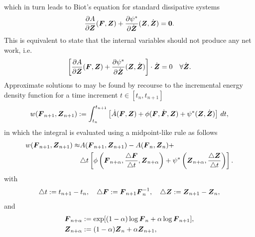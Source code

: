 \documentclass[12pt]{article}
\numberwithin{equation}{section}
\begin{document}
which in turn leads to Biot's equation for standard dissipative systems
\begin{equation} \label{eq:Biots-equation}
  \frac{\partial A}{\partial {\boldsymbol{Z}}} ({\boldsymbol{F}}, {\boldsymbol{Z}})
  +
  \frac{\partial \psi^*}{\partial \dot{{\boldsymbol{Z}}}} ({\boldsymbol{Z}}, \dot{{\boldsymbol{Z}}})
  =
  \mathbf{0}.
\end{equation}
This is equivalent to state that the internal variables should not
produce any net work, i.e.
\begin{equation} \label{eq:internal-no-work}
  \left[
    \frac{\partial A}{\partial {\boldsymbol{Z}}} ({\boldsymbol{F}}, {\boldsymbol{Z}})
    +
    \frac{\partial \psi^*}{\partial \dot{{\boldsymbol{Z}}}} ({\boldsymbol{Z}}, \dot{{\boldsymbol{Z}}})
  \right]
  \cdot
   \dot{{\boldsymbol{Z}}}
  =
  0
  \quad
  \forall \dot{{\boldsymbol{Z}}}.
\end{equation}
Approximate solutions to  may be found by
recourse to the incremental energy density function for a time
increment $t \in [t_n, t_{n+1}]$
\begin{equation} \label{incremental-energy-density}
  w({\boldsymbol{F}}_{n+1}, {\boldsymbol{Z}}_{n+1}) := 
  \int_{t_n}^{t_{n+1}}
  \left[
    \dot{A}({\boldsymbol{F}}, {\boldsymbol{Z}})
    +
    \phi({\boldsymbol{F}}, \dot{{\boldsymbol{F}}}, {\boldsymbol{Z}})
    +
    \psi^*({\boldsymbol{Z}}, \dot{{\boldsymbol{Z}}})
  \right]
  \, dt,
\end{equation}
in which the integral is evaluated using a midpoint-like rule
as follows
\begin{equation} \label{incremental-energy-density-mid-point}
  \begin{split}
    w({\boldsymbol{F}}_{n+1}, {\boldsymbol{Z}}_{n+1}) \approx
    &
    A({\boldsymbol{F}}_{n+1}, {\boldsymbol{Z}}_{n+1}) - A({\boldsymbol{F}}_n, {\boldsymbol{Z}}_n) +
    \\
    &
    \triangle t
    \left[
      \phi
      \left(
        {\boldsymbol{F}}_{n+\alpha}, \frac{\triangle {\boldsymbol{F}}}{\triangle t}, {\boldsymbol{Z}}_{n+\alpha}
      \right)
      +
      \psi^*
      \left(
        {\boldsymbol{Z}}_{n+\alpha}, \frac{\triangle {\boldsymbol{Z}}}{\triangle t}
      \right)
    \right].
  \end{split}
\end{equation}
with
\begin{equation} \label{eq:increments}
  \triangle t := t_{n+1} - t_n,
  \quad
  \triangle {\boldsymbol{F}} := {\boldsymbol{F}}_{n+1} {\boldsymbol{F}}_n^{-1},
  \quad
  \triangle {\boldsymbol{Z}} := {\boldsymbol{Z}}_{n+1} - {\boldsymbol{Z}}_n,
\end{equation}
and
\begin{equation} \label{eq:mid-values}
  \begin{split}
    {\boldsymbol{F}}_{n+\alpha} & := \exp[(1 - \alpha) \log {\boldsymbol{F}}_n + \alpha \log {\boldsymbol{F}}_{n+1}],
    \\
    {\boldsymbol{Z}}_{n+\alpha} & := (1 - \alpha) {\boldsymbol{Z}}_n + \alpha {\boldsymbol{Z}}_{n+1},
  \end{split}
\end{equation}
\end{document}
